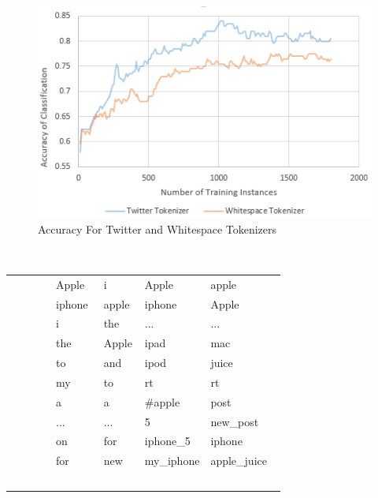 \documentclass[letterpaper]{article}
\begin{document}
\begin{figure}[ht]
\centering
\includegraphics[width=\linewidth]{chart_twitterVSwhitespace_detailed}
\caption{Accuracy For Twitter and Whitespace Tokenizers}
\label{fig:chart_twitterwhitespace_detailed}
\end{figure}


\begin{table}[h]
    \begin{tabular}{|l|l|l|l|}
    \hline
        Apple  & i     & Apple     & apple        \\
        iphone & apple & iphone    & Apple        \\ 
        i      & the   & ...       & ...          \\ 
        the    & Apple & ipad      & mac          \\ 
        to     & and   & ipod      & juice        \\ 
        my     & to    & rt        & rt           \\ 
        a      & a     & \#apple    & post        \\ 
        ...    & ...   & 5         & new\_post    \\ 
        on     & for   & iphone\_5  & iphone      \\ 
        for    & new   & my\_iphone & apple\_juice\\
      \hline
    \end{tabular}
\end{table}
\end{document}
